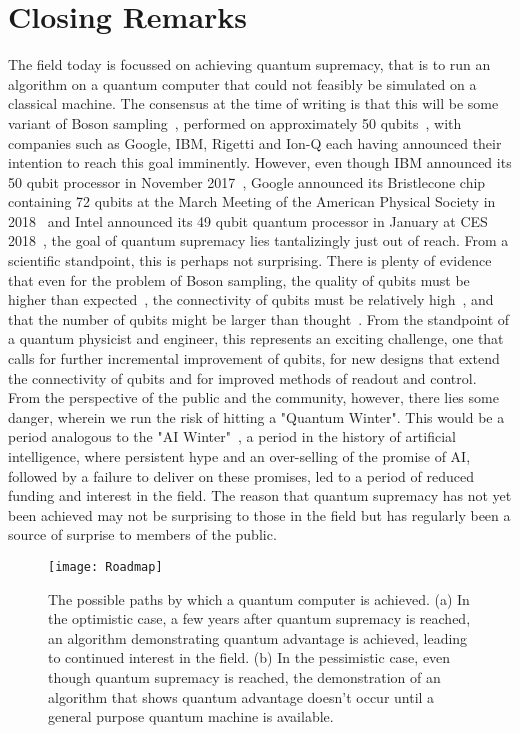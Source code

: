 \section{Closing Remarks}
The field today is focussed on achieving quantum supremacy, that is to run an algorithm on a quantum computer that could not feasibly be
simulated on a classical machine. The consensus at the time of writing is that this will be some variant of Boson sampling~\cite{Aaronson:2011},
performed on approximately 50 qubits~\cite{savage,8322045,10.1038/s41567-018-0131-y}, with companies such as Google, IBM, Rigetti and Ion-Q each having
announced their intention to reach this goal imminently. However, even though IBM announced its 50 qubit processor in November 2017~\cite{ibmq}, Google announced
its Bristlecone chip containing 72 qubits at the March Meeting of the American Physical Society in 2018~\cite{gcryocmos,Neill195} and Intel announced
its 49 qubit quantum processor in January at CES 2018~\cite{intelq}, the goal of quantum supremacy lies tantalizingly just out of reach. From a scientific standpoint,
this is perhaps not surprising. There is plenty of evidence that even for the problem of Boson sampling, the quality of qubits must be higher
than expected~\cite{PhysRevX.6.021039,PhysRevLett.117.080501}, the connectivity of qubits must be relatively high~\cite{s41567-018-0124-x},
and that the number of qubits might be larger than thought~\cite{2017arXiv171005867P}.
From the standpoint of a quantum physicist and engineer, this represents an exciting challenge, one that calls for further incremental improvement of qubits,
for new designs that extend the connectivity of qubits and for improved methods of readout and control. From the perspective of the public and the community, however,
there lies some danger, wherein we run the risk of hitting a "Quantum Winter". This would be a period analogous to the "AI Winter"~\cite{crevier1993ai},
a period in the history of artificial intelligence, where persistent hype and an over-selling of the promise of AI, followed by a failure to deliver on these promises,
led to a period of reduced funding and interest in the field. The reason that quantum supremacy has not yet been achieved may not be surprising to those in the
field but has regularly been a source of surprise to members of the public.

\begin{figure}
    \texttt{[image: Roadmap]}
    \caption[Roadmap to a quantum computer]{\label{fig:roadmap} The possible paths by which a quantum computer is achieved. (a) In the optimistic case,
    a few years after quantum supremacy is reached, an algorithm demonstrating quantum advantage is achieved, leading to continued interest in the field. (b) In the pessimistic case,
    even though quantum supremacy is reached, the demonstration of an algorithm that shows quantum advantage doesn't occur until a general purpose quantum machine is available.}
\end{figure}

